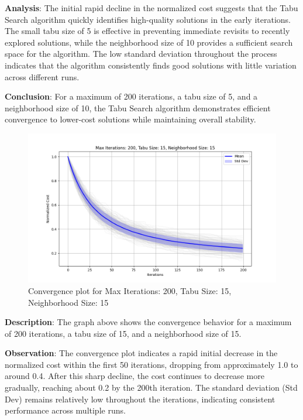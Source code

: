 \documentclass[
]{article}
\begin{document}
    \textbf{Analysis}: The initial rapid decline in the normalized cost suggests that the Tabu Search algorithm quickly identifies high-quality solutions in the early iterations. The small tabu size of 5 is effective in preventing immediate revisits to recently explored solutions, while the neighborhood size of 10 provides a sufficient search space for the algorithm. The low standard deviation throughout the process indicates that the algorithm consistently finds good solutions with little variation across different runs.

    \textbf{Conclusion}: For a maximum of 200 iterations, a tabu size of 5, and a neighborhood size of 10, the Tabu Search algorithm demonstrates efficient convergence to lower-cost solutions while maintaining overall stability.

    \begin{figure}[H]
        \centering
        \includegraphics[width=\textwidth]{tabu_search/max_iter_200_tabu_size_15_neighborhood_size_15}
        \caption{Convergence plot for Max Iterations: 200, Tabu Size: 15, Neighborhood Size: 15}
        \label{fig:ts_200_15_15}
    \end{figure}

    \textbf{Description}: The graph above shows the convergence behavior for a maximum of 200 iterations, a tabu size of 15, and a neighborhood size of 15.

    \textbf{Observation}: The convergence plot indicates a rapid initial decrease in the normalized cost within the first 50 iterations, dropping from approximately 1.0 to around 0.4. After this sharp decline, the cost continues to decrease more gradually, reaching about 0.2 by the 200th iteration. The standard deviation (Std Dev) remains relatively low throughout the iterations, indicating consistent performance across multiple runs.
\end{document}

